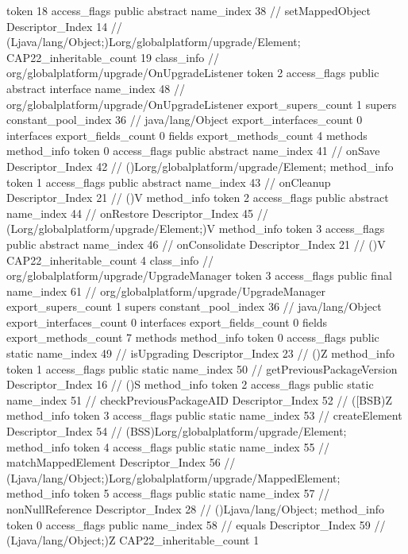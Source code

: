 {{{{{					token	18
					access_flags	public abstract
					name_index	38		// setMappedObject
					Descriptor_Index	14		// (Ljava/lang/Object;)Lorg/globalplatform/upgrade/Element;
				}
			}
			CAP22_inheritable_count	19
		}
		class_info {		// org/globalplatform/upgrade/OnUpgradeListener
			token	2
			access_flags	public abstract interface
			name_index	48		// org/globalplatform/upgrade/OnUpgradeListener
			export_supers_count	1
			supers {
				constant_pool_index	36		// java/lang/Object
			}
			export_interfaces_count	0
			interfaces {
			}
			export_fields_count	0
			fields {
			}
			export_methods_count	4
			methods {
				method_info {
					token	0
					access_flags	public abstract
					name_index	41		// onSave
					Descriptor_Index	42		// ()Lorg/globalplatform/upgrade/Element;
				}
				method_info {
					token	1
					access_flags	public abstract
					name_index	43		// onCleanup
					Descriptor_Index	21		// ()V
				}
				method_info {
					token	2
					access_flags	public abstract
					name_index	44		// onRestore
					Descriptor_Index	45		// (Lorg/globalplatform/upgrade/Element;)V
				}
				method_info {
					token	3
					access_flags	public abstract
					name_index	46		// onConsolidate
					Descriptor_Index	21		// ()V
				}
			}
			CAP22_inheritable_count	4
		}
		class_info {		// org/globalplatform/upgrade/UpgradeManager
			token	3
			access_flags	public final
			name_index	61		// org/globalplatform/upgrade/UpgradeManager
			export_supers_count	1
			supers {
				constant_pool_index	36		// java/lang/Object
			}
			export_interfaces_count	0
			interfaces {
			}
			export_fields_count	0
			fields {
			}
			export_methods_count	7
			methods {
				method_info {
					token	0
					access_flags	public static
					name_index	49		// isUpgrading
					Descriptor_Index	23		// ()Z
				}
				method_info {
					token	1
					access_flags	public static
					name_index	50		// getPreviousPackageVersion
					Descriptor_Index	16		// ()S
				}
				method_info {
					token	2
					access_flags	public static
					name_index	51		// checkPreviousPackageAID
					Descriptor_Index	52		// ([BSB)Z
				}
				method_info {
					token	3
					access_flags	public static
					name_index	53		// createElement
					Descriptor_Index	54		// (BSS)Lorg/globalplatform/upgrade/Element;
				}
				method_info {
					token	4
					access_flags	public static
					name_index	55		// matchMappedElement
					Descriptor_Index	56		// (Ljava/lang/Object;)Lorg/globalplatform/upgrade/MappedElement;
				}
				method_info {
					token	5
					access_flags	public static
					name_index	57		// nonNullReference
					Descriptor_Index	28		// ()Ljava/lang/Object;
				}
				method_info {
					token	0
					access_flags	public
					name_index	58		// equals
					Descriptor_Index	59		// (Ljava/lang/Object;)Z
				}
			}
			CAP22_inheritable_count	1
		}
	}
}
